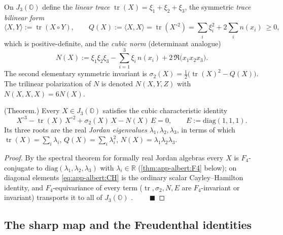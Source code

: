 \begin{definition}\label{def:app-albert:invariants}
On $J_3(\mathbb O)$ define the \emph{linear trace}
$\operatorname{tr}(X)=\xi_1+\xi_2+\xi_3$, the symmetric \emph{trace bilinear form}
\begin{equation}\label{eq:app-albert:Q}
  \langle X,Y\rangle:=\operatorname{tr}(X\circ Y),
  \qquad
  Q(X):=\langle X,X\rangle=\operatorname{tr}(X^{\circ2})
  =\sum_i\xi_i^2+2\sum_i n(x_i)\ \ge 0,
\end{equation}
which is positive-definite, and the \emph{cubic norm} (determinant analogue)
\begin{equation}\label{eq:app-albert:N}
  N(X):=\xi_1\xi_2\xi_3-\sum_{i=1}^{3}\xi_i\,n(x_i)+2\,\Re\!\bigl(x_1 x_2 x_3\bigr).
\end{equation}
The second elementary symmetric invariant is
$\sigma_2(X)=\tfrac12\bigl(\operatorname{tr}(X)^2-Q(X)\bigr)$. The trilinear
polarization of $N$ is denoted $N(X,Y,Z)$ with $N(X,X,X)=6N(X)$.
\end{definition}

\begin{theorem}\label{thm:app-albert:CH}
\textup{(Theorem.)}
Every $X\in J_3(\mathbb O)$ satisfies the cubic characteristic identity
\begin{equation}\label{eq:app-albert:CH}
  X^{\circ3}-\operatorname{tr}(X)\,X^{\circ2}+\sigma_2(X)\,X-N(X)\,E=0,
  \qquad E:=\mathrm{diag}(1,1,1).
\end{equation}
Its three roots are the real \emph{Jordan eigenvalues}
$\lambda_1,\lambda_2,\lambda_3$, in terms of which
$\operatorname{tr}(X)=\sum_i\lambda_i$, $Q(X)=\sum_i\lambda_i^2$,
$N(X)=\lambda_1\lambda_2\lambda_3$.
\end{theorem}

\begin{proof}
By the spectral theorem for formally real Jordan algebras every $X$ is
$F_4$-conjugate to $\mathrm{diag}(\lambda_1,\lambda_2,\lambda_3)$ with
$\lambda_i\in\mathbb R$ (\autoref{thm:app-albert:F4} below); on diagonal elements
\eqref{eq:app-albert:CH} is the ordinary scalar Cayley--Hamilton identity, and
$F_4$-equivariance of every term ($\operatorname{tr},\sigma_2,N,E$ are
$F_4$-invariant or invariant) transports it to all of $J_3(\mathbb O)$
\cite{McCrimmon:2004,Springer:2000}. $\qquad\blacksquare$
\end{proof}

\subsection{The sharp map and the Freudenthal identities}
\label{sec:app-albert:sharp}

